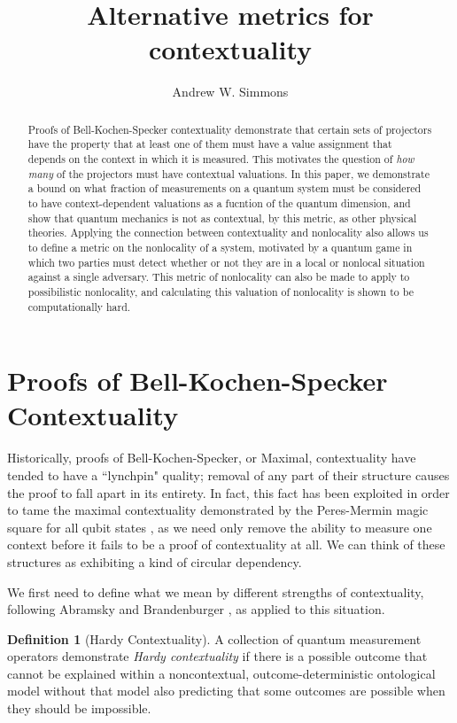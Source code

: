 \documentclass{amsart}
\theoremstyle{definition}
\newtheorem{defn}{Definition}
\begin{document}
\title{Alternative metrics for contextuality}
\author{Andrew W. Simmons}
\address{Department of Physics, Imperial College London, SW7 2AZ.}
\begin{abstract}
Proofs of Bell-Kochen-Specker contextuality demonstrate that certain sets of projectors have the property that at least one of them must have a value assignment that depends on the context in which it is measured. This motivates the question of \emph{how many} of the projectors must have contextual valuations. In this paper, we demonstrate a bound on what fraction of measurements on a quantum system must be considered to have context-dependent valuations as a fucntion of the quantum dimension, and show that quantum mechanics is not as contextual, by this metric, as other physical theories. Applying the connection between contextuality and nonlocality also allows us to define a metric on the nonlocality of a system, motivated by a quantum game in which two parties must detect whether or not they are in a local or nonlocal situation against a single adversary.  This metric of nonlocality can also be made to apply to possibilistic nonlocality, and calculating this valuation of nonlocality is shown to be computationally hard.
\end{abstract}
\maketitle
\section{Proofs of Bell-Kochen-Specker Contextuality}

Historically, proofs of Bell-Kochen-Specker, or Maximal, contextuality have tended to have a ``lynchpin" quality; removal of any part of their structure causes the proof to fall apart in its entirety.  In fact, this fact has been exploited in order to tame the maximal contextuality demonstrated by the Peres-Mermin magic square for all qubit states \cite{Berm2016}, as we need only remove the ability to measure one context before it fails to be a proof of contextuality at all. We can think of these structures as exhibiting a kind of circular dependency.

We first need to define what we mean by different strengths of contextuality, following Abramsky and Brandenburger \cite{Abra2011}, as applied to this situation.

\begin{defn}[Hardy Contextuality]
A collection of quantum measurement operators demonstrate \emph{Hardy contextuality} if there is a possible outcome that cannot be explained within a noncontextual, outcome-deterministic ontological model without that model also predicting that some outcomes are possible when they should be impossible.
\end{defn}
\end{document}
